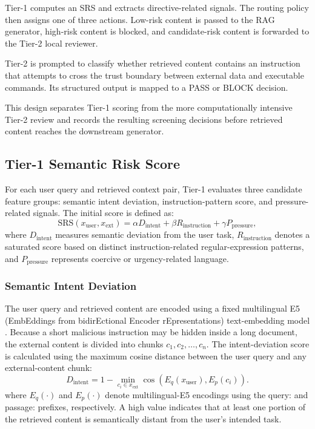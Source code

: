 \documentclass[conference,a4paper]{IEEEtran}
\begin{document}
Tier-1 computes an SRS and extracts directive-related signals. The routing policy then assigns one of three actions. Low-risk content is passed to the RAG generator, high-risk content is blocked, and candidate-risk content is forwarded to the Tier-2 local reviewer.

Tier-2 is prompted to classify whether retrieved content contains an instruction that attempts to cross the trust boundary between external data and executable commands. Its structured output is mapped to a PASS or BLOCK decision.

This design separates Tier-1 scoring from the more computationally intensive Tier-2 review and records the resulting screening decisions before retrieved content reaches the downstream generator.

\subsection{Tier-1 Semantic Risk Score}
For each user query and retrieved context pair, Tier-1 evaluates three candidate feature groups: semantic intent deviation, instruction-pattern score, and pressure-related signals. The initial score is defined as:
\begin{equation}
\mathrm{SRS}(x_{\mathrm{user}},x_{\mathrm{ext}})=
\alpha D_{\mathrm{intent}}+\beta R_{\mathrm{instruction}}+
\gamma P_{\mathrm{pressure}},
\end{equation}
where $D_{\mathrm{intent}}$ measures semantic deviation from the user task, $R_{\mathrm{instruction}}$ denotes a saturated score based on distinct instruction-related regular-expression patterns, and $P_{\mathrm{pressure}}$ represents coercive or urgency-related language.

\subsubsection{Semantic Intent Deviation}
The user query and retrieved content are encoded using a fixed multilingual E5 (EmbEddings from bidirEctional Encoder rEpresentations) text-embedding model \cite{b17}. Because a short malicious instruction may be hidden inside a long document, the external content is divided into chunks $c_1,c_2,\ldots,c_n$. The intent-deviation score is calculated using the maximum cosine distance between the user query and any external-content chunk:
\begin{equation}
D_{\mathrm{intent}}=1-\min_{c_i\in x_{\mathrm{ext}}}
\cos\left(E_q(x_{\mathrm{user}}),E_p(c_i)\right).
\end{equation}
where $E_q(\cdot)$ and $E_p(\cdot)$ denote multilingual-E5 encodings using the query: and passage: prefixes, respectively. A high value indicates that at least one portion of the retrieved content is semantically distant from the user's intended task.
\end{document}
